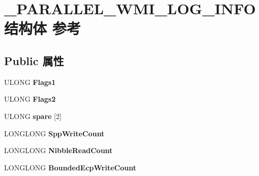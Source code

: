 \hypertarget{struct___p_a_r_a_l_l_e_l___w_m_i___l_o_g___i_n_f_o}{}\section{\+\_\+\+P\+A\+R\+A\+L\+L\+E\+L\+\_\+\+W\+M\+I\+\_\+\+L\+O\+G\+\_\+\+I\+N\+F\+O结构体 参考}
\label{struct___p_a_r_a_l_l_e_l___w_m_i___l_o_g___i_n_f_o}
\subsection*{Public 属性}
\begin{DoxyCompactItemize}
\item 
\mbox{\label{struct___p_a_r_a_l_l_e_l___w_m_i___l_o_g___i_n_f_o_a493ff49e42222e46ca397ddbea7797d6}} 
U\+L\+O\+NG {\bfseries Flags1}
\item 
\mbox{\label{struct___p_a_r_a_l_l_e_l___w_m_i___l_o_g___i_n_f_o_a78ac71121a42fde36914f634e4aef6ee}} 
U\+L\+O\+NG {\bfseries Flags2}
\item 
\mbox{\label{struct___p_a_r_a_l_l_e_l___w_m_i___l_o_g___i_n_f_o_a0c409eb280136281c1403bf605a971bc}} 
U\+L\+O\+NG {\bfseries spare} \mbox{[}2\mbox{]}
\item 
\mbox{\label{struct___p_a_r_a_l_l_e_l___w_m_i___l_o_g___i_n_f_o_a8926a56815d76f5063a6a06da132a3d0}} 
L\+O\+N\+G\+L\+O\+NG {\bfseries Spp\+Write\+Count}
\item 
\mbox{\label{struct___p_a_r_a_l_l_e_l___w_m_i___l_o_g___i_n_f_o_a4d00d3d7018dc8a8392e8b9e1abfdbcf}} 
L\+O\+N\+G\+L\+O\+NG {\bfseries Nibble\+Read\+Count}
\item 
\mbox{\label{struct___p_a_r_a_l_l_e_l___w_m_i___l_o_g___i_n_f_o_adaabdf0622f2e9f25417f9447207e95d}} 
L\+O\+N\+G\+L\+O\+NG {\bfseries Bounded\+Ecp\+Write\+Count}
\item 
\mbox{\label{struct___p_a_r_a_l_l_e_l___w_m_i___l_o_g___i_n_f_o_a87b8404dcc34499b9f1986e8d70e8c73}} 

\end{DoxyCompactItemize}

